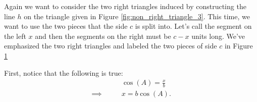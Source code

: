 Again we want to consider the two right triangles induced by constructing the
line $h$ on the triangle given in Figure \ref{fig:non_right_triangle_3}. This
time, we want to use the two pieces that the side $c$ is split into. Let's call
the segment on the left $x$ and then the segments on the right must be $c - x$
units long. We've emphasized the two right triangles and labeled the two pieces
of side $c$ in Figure
\ref{fig:non_right_triangle_split_into_two_right_triangles_2}

\begin{figure}[htpb]
	\centering


	\caption{}
	\label{fig:non_right_triangle_split_into_two_right_triangles_2}
\end{figure}

First, notice that the following is true:
\begin{align*}
  \qquad&\cos (A) = \frac{x}{b} \\
  \implies\qquad&x = b\cos (A)
.\end{align*}


